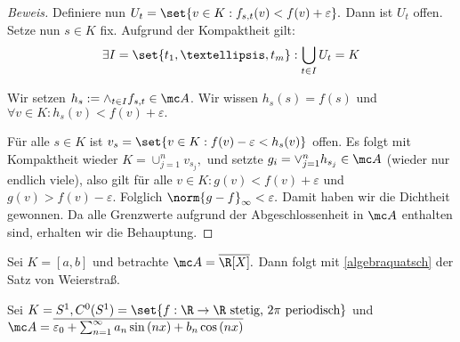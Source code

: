 \begin{theorem}
\begin{proof}[Beweis]
		Definiere nun $U_t = \set{v \in K: f_{s, t}(v) < f(v)+\varepsilon}.$ Dann ist $U_t$ offen. Setze nun $s \in K$ fix. Aufgrund der Kompaktheit gilt: \[\exists I = \set{t_1, …, t_m}: \bigcup_{t \in I}U_t = K\] 
		
		Wir setzen $h_s := \land_{t \in I}f_{s, t} \in \mc A$. Wir wissen $h_s(s)=f(s)$ und $\forall v \in K: h_s(v) < f(v)+\varepsilon.$
		
		Für alle $s \in K$ ist $v_s = \set{v \in K: f(v)- \varepsilon < h_s(v)}$ offen. Es folgt mit Kompaktheit wieder $K = \cup_{j=1}^n v_{s_j},$ und setzte $g_i = \lor_{j=1}^n h_{s_j} \in \mc A$ (wieder nur endlich viele), also gilt für alle $v \in K: g(v) < f(v)+\varepsilon$ und $g(v) > f(v) -\varepsilon.$ Folglich $\norm{g-f}_{\infty} < \varepsilon.$ Damit haben wir die Dichtheit gewonnen. Da alle Grenzwerte aufgrund der Abgeschlossenheit in $\mc A$ enthalten sind, erhalten wir die Behauptung.
		
	\end{proof}
	
\end{theorem}


\begin{ex} Sei $K = [a, b]$ und betrachte $\mc A = \overline{\R[X]}.$ Dann folgt mit \ref{algebraquatsch} der Satz von Weierstraß. 
	
\end{ex}


\begin{ex} Sei $K = S^1, C^0(S^1) = \set{f: \R \to \R \text{ stetig, }2\pi \text{ periodisch}}$ und \\\(\mc A = \overline{\varepsilon_0 + \sum_{n = 1}^{\infty}a_n \sin{(nx)} + b_n \cos{(nx)}}\)
	
\end{ex}

